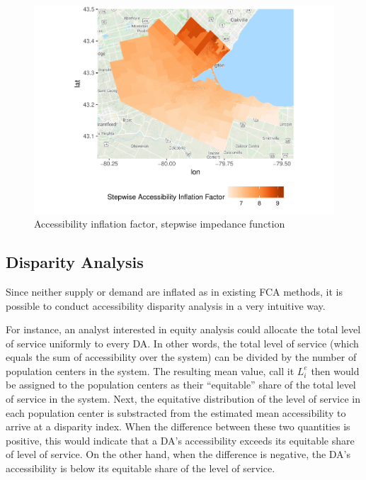\documentclass[10pt,letterpaper]{article}
\begin{document}
\begin{figure}
\centering
\includegraphics{Supply_and_Demand_Inflation_in_FCA_Methods_v2.0_files/figure-latex/fig13-map-accessibility-stepwise-comparison-1.pdf}
\caption{\label{fig:fig13-map-accessibility-stepwise-comparison}Accessibility
inflation factor, stepwise impedance function}
\end{figure}

\subsection{Disparity Analysis}\label{disparity-analysis}

Since neither supply or demand are inflated as in existing FCA methods,
it is possible to conduct accessibility disparity analysis in a very
intuitive way.

For instance, an analyst interested in equity analysis could allocate
the total level of service uniformly to every DA. In other words, the
total level of service (which equals the sum of accessibility over the
system) can be divided by the number of population centers in the
system. The resulting mean value, call it \(L_i^e\) then would be
assigned to the population centers as their ``equitable'' share of the
total level of service in the system. Next, the equitative distribution
of the level of service in each population center is substracted from
the estimated mean accessibility to arrive at a disparity index. When
the difference between these two quantities is positive, this would
indicate that a DA's accessibility exceeds its equitable share of level
of service. On the other hand, when the difference is negative, the DA's
accessibility is below its equitable share of the level of service.
\end{document}
